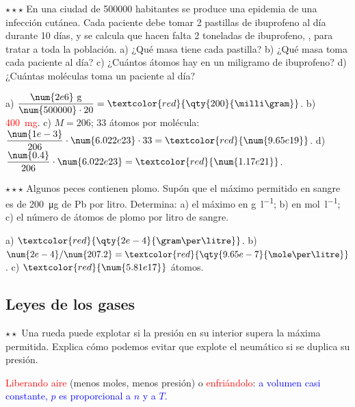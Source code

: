 \begin{exercise}
    \(\star\star\star\) En una ciudad de \num{500000} habitantes se produce una epidemia de una infección cutánea. Cada paciente debe tomar 2
    pastillas de ibuprofeno al día durante 10 días, y se calcula que hacen falta 2 toneladas de ibuprofeno, , para tratar a
    toda la población. a) ¿Qué masa tiene cada pastilla? b) ¿Qué masa toma cada paciente al día? c) ¿Cuántos átomos hay en un miligramo de
    ibuprofeno? d) ¿Cuántas moléculas toma un paciente al día?
    \begin{solu}
        a) \(\dfrac{\num{2e6}\text{ g}}{\num{500000} \cdot 20} = \textcolor{red}{\qty{200}{\milli\gram}}\). b) \textcolor{red}{\qty{400}{\milli\gram}}.
        c) \(M = 206\); 33 átomos por molécula: \(\dfrac{\num{1e-3}}{206} \cdot \num{6.022e23} \cdot 33 = \textcolor{red}{\num{9.65e19}}\).
        d) \(\dfrac{\num{0.4}}{206} \cdot \num{6.022e23} = \textcolor{red}{\num{1.17e21}}\).
    \end{solu}
\end{exercise}

\begin{exercise}
    \(\star\star\star\) Algunos peces contienen plomo. Supón que el máximo permitido en sangre es de \qty{200}{\micro\gram} de Pb por litro. Determina:
    a) el máximo en \unit{\gram\per\litre}; b) en \unit{\mole\per\litre}; c) el número de átomos de plomo por litro de sangre.
    \begin{solu}
        a) \(\textcolor{red}{\qty{2e-4}{\gram\per\litre}}\). b) \(\num{2e-4}/\num{207.2} = \textcolor{red}{\qty{9.65e-7}{\mole\per\litre}}\).
        c) \(\textcolor{red}{\num{5.81e17}}\) átomos.
    \end{solu}
\end{exercise}

\subsection{Leyes de los gases}

\begin{exercise}
    \(\star\star\) Una rueda puede explotar si la presión en su interior supera la máxima permitida. Explica cómo podemos evitar que
    explote el neumático si se duplica su presión.
    \begin{solu}
        \textcolor{red}{Liberando aire} (menos moles, menos presión) o \textcolor{red}{enfriándolo}: \textcolor{blue}{a volumen casi constante,
        \(p\) es proporcional a \(n\) y a \(T\).}
    \end{solu}
\end{exercise}


